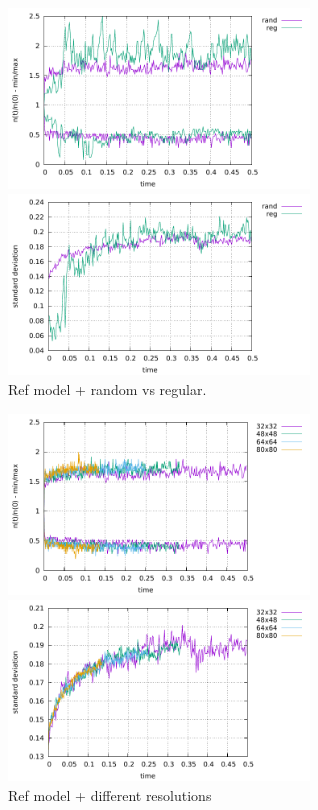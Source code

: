 \begin{center}
\includegraphics[width=8cm]{python_codes/fieldstone_30/results_streamline/markercount_reg}
\includegraphics[width=8cm]{python_codes/fieldstone_30/results_streamline/stdev_reg}\\
{\captionfont Ref model + random vs regular.} 
\end{center}

\begin{center}
\includegraphics[width=8cm]{python_codes/fieldstone_30/results_streamline/markercount_res}
\includegraphics[width=8cm]{python_codes/fieldstone_30/results_streamline/stdev_res}\\
{\captionfont Ref model + different resolutions}
\end{center}








